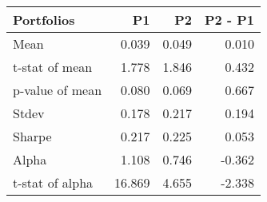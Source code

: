 \begin{tabular}{lrrr}
\toprule
Portfolios & P1 & P2 & P2 - P1 \\
\midrule
Mean & 0.039 & 0.049 & 0.010 \\
t-stat of mean & 1.778 & 1.846 & 0.432 \\
p-value of mean & 0.080 & 0.069 & 0.667 \\
Stdev & 0.178 & 0.217 & 0.194 \\
Sharpe & 0.217 & 0.225 & 0.053 \\
Alpha & 1.108 & 0.746 & -0.362 \\
t-stat of alpha & 16.869 & 4.655 & -2.338 \\
\bottomrule
\end{tabular}
